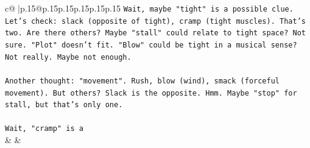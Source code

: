 \documentclass{article}
\begin{document}
{\begin{supertabular}{c@{$\;$}|p{.15\linewidth}@{}p{.15\linewidth}p{.15\linewidth}p{.15\linewidth}p{.15\linewidth}p{.15\linewidth}}
{{{\texttt{Wait, maybe "tight" is a possible clue. Let's check: slack (opposite of tight), cramp (tight muscles). That's two. Are there others? Maybe "stall" could relate to tight space? Not sure. "Plot" doesn't fit. "Blow" could be tight in a musical sense? Not really. Maybe not enough.} \\
\\ 
\texttt{Another thought: "movement". Rush, blow (wind), smack (forceful movement). But others? Slack is the opposite. Hmm. Maybe "stop" for stall, but that's only one.} \\
\\ 
\texttt{Wait, "cramp" is a} \\
            }
        }
    }
    & & \\ \\


\end{supertabular}}
\end{document}
